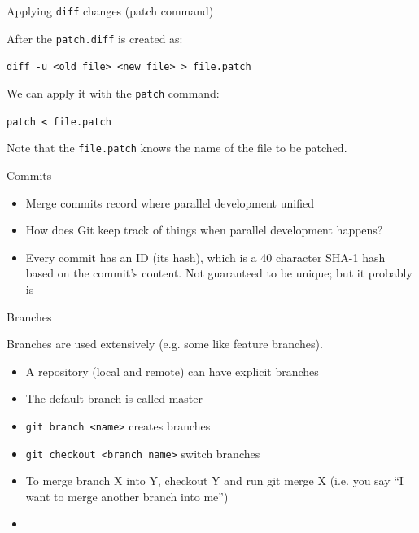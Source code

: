 \documentclass{beamer}
\begin{document}

\begin{frame}{Applying \texttt{diff} changes (patch command)}

After the \texttt{patch.diff} is created as:

\texttt{diff -u <old file> <new file> > file.patch }

We can apply it with the \texttt{patch} command:

\texttt{patch < file.patch}

Note that the \texttt{file.patch} knows the name of the file to be patched.


\end{frame}



\begin{frame}{Commits}

\begin{itemize}
 \item Merge commits record where parallel development unified
 \item How does Git keep track of things when parallel development
happens?
\item Every commit has an ID (its hash), which is a 40 character SHA-1
hash based on the commit's content. Not guaranteed to be
unique; but it probably is
\end{itemize}

\end{frame}

\begin{frame}{Branches}

Branches are used extensively (e.g. some like feature branches).

\begin{itemize}
 \item A repository (local and remote) can have explicit branches
 \item The default branch is called master
 \item \texttt{git branch <name>} creates branches
 \item \texttt{git checkout <branch name>} switch branches
 \item To merge branch X into Y, checkout Y and run git merge X
(i.e. you say “I want to merge another branch into me”)
 \item 
\end{itemize}


\end{frame}
\end{document}
